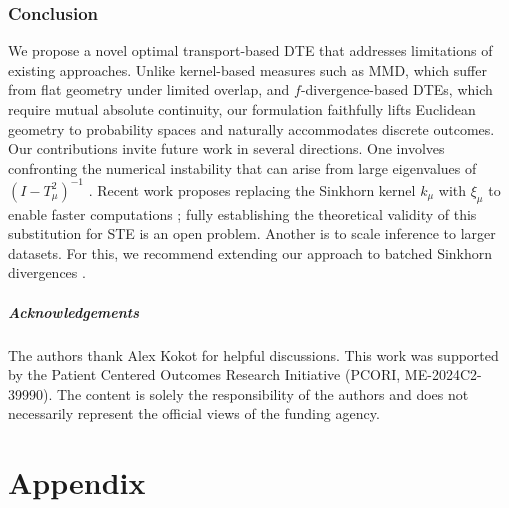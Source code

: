 \documentclass{article}
\theoremstyle{plain}
\theoremstyle{definition}
\theoremstyle{remark}
\newcommand{\1}{\mathbbm{1}}
\theoremstyle{plain}
\theoremstyle{definition}
\begin{document}
\section{Conclusion}\label{sec:conclusion}
We propose a novel optimal transport-based DTE that addresses limitations of existing approaches. Unlike kernel-based measures such as MMD, which suffer from flat geometry under limited overlap, and 
$f$-divergence-based DTEs, which require mutual absolute continuity, our formulation faithfully lifts Euclidean geometry to probability spaces and naturally accommodates discrete outcomes.
Our contributions invite future work in several directions. One involves confronting the numerical instability that can arise from large eigenvalues of $(I - T_\mu^2)^{-1}$ \cite{lavenant2024riemannian}. Recent work proposes replacing the Sinkhorn kernel $k_\mu$ with $\xi_\mu$ to enable faster computations \citep[Lem.~12]{kokot2025coreset}; fully establishing the theoretical validity of this substitution for STE is an open problem. Another is to scale inference to larger datasets. For this, we recommend extending our approach to batched Sinkhorn divergences \cite{peyre2019computational}.

\subsubsection*{Acknowledgements}
The authors thank Alex Kokot for helpful discussions. This work was supported by the Patient Centered Outcomes Research Initiative (PCORI, ME-2024C2-39990). The
content is solely the responsibility of the authors and does not necessarily represent the official views of the funding
agency.





\newpage
\appendix
\onecolumn
\onehalfspacing

\makeatletter
\def\addcontentsline#1#2#3{%
  \addtocontents{#1}{\protect\contentsline{#2}{#3}{\thepage}{\@currentHref}}}
\makeatother

\renewcommand{\thepart}{}
\renewcommand{\partname}{}
\part{Appendix}
\end{document}
